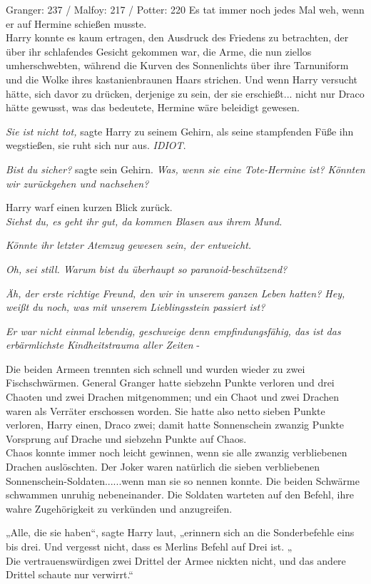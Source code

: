 {Granger: 237 / Malfoy: 217 / Potter: 220 Es tat immer noch jedes Mal weh, wenn er auf Hermine schießen musste.\\ Harry konnte es kaum ertragen, den Ausdruck des Friedens zu betrachten, der über ihr schlafendes Gesicht gekommen war, die Arme, die nun ziellos umherschwebten, während die Kurven des Sonnenlichts über ihre Tarnuniform und die Wolke ihres kastanienbraunen Haars strichen. Und wenn Harry versucht hätte, sich davor zu drücken, derjenige zu sein, der sie erschießt... nicht nur Draco hätte gewusst, was das bedeutete, Hermine wäre beleidigt gewesen.

\emph{Sie ist nicht tot,} sagte Harry zu seinem Gehirn, als seine stampfenden Füße ihn wegstießen, sie ruht sich nur aus. \emph{IDIOT}.

\emph{Bist du sicher?} sagte sein Gehirn. \emph{Was, wenn sie eine Tote-Hermine ist? Könnten wir zurückgehen und nachsehen?}

Harry warf einen kurzen Blick zurück.\\ \emph{Siehst du, es geht ihr gut, da kommen Blasen aus ihrem Mund.}

\emph{Könnte ihr letzter Atemzug gewesen sein, der entweicht.}

\emph{Oh, sei still. Warum bist du überhaupt so paranoid-beschützend?}

\emph{Äh, der erste richtige Freund, den wir in unserem ganzen Leben hatten? Hey, weißt du noch, was mit unserem Lieblingsstein passiert ist?}

\emph{Er war nicht einmal lebendig, geschweige denn empfindungsfähig, das ist das erbärmlichste Kindheitstrauma aller Zeiten} -

Die beiden Armeen trennten sich schnell und wurden wieder zu zwei Fischschwärmen. General Granger hatte siebzehn Punkte verloren und drei Chaoten und zwei Drachen mitgenommen; und ein Chaot und zwei Drachen waren als Verräter erschossen worden. Sie hatte also netto sieben Punkte verloren, Harry einen, Draco zwei; damit hatte Sonnenschein zwanzig Punkte Vorsprung auf Drache und siebzehn Punkte auf Chaos.\\ Chaos konnte immer noch leicht gewinnen, wenn sie alle zwanzig verbliebenen Drachen auslöschten. Der Joker waren natürlich die sieben verbliebenen Sonnenschein-Soldaten......wenn man sie so nennen konnte. Die beiden Schwärme schwammen unruhig nebeneinander. Die Soldaten warteten auf den Befehl, ihre wahre Zugehörigkeit zu verkünden und anzugreifen.

„Alle, die sie haben“, sagte Harry laut, „erinnern sich an die Sonderbefehle eins bis drei. Und vergesst nicht, dass es Merlins Befehl auf Drei ist. „\\ Die vertrauenswürdigen zwei Drittel der Armee nickten nicht, und das andere Drittel schaute nur verwirrt.“

}
